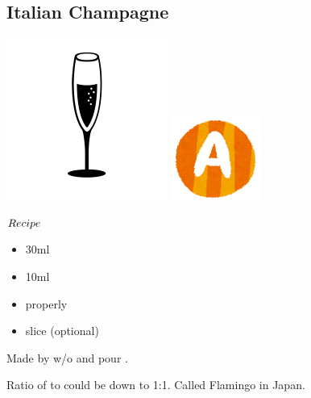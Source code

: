 \subsection{Italian Champagne}
\vspace{-7.4mm}
\hspace{49mm}
\includegraphics[scale=.08]{cocktail_glass_flute.png}
\includegraphics[scale=.12]{capital_a.png}
\vspace{2.5mm}
\begin{itembox}[l]{\boldmath $Recipe$}
\begin{itemize}
\setlength{\parskip}{0cm}
\setlength{\itemsep}{0cm}
\item \vodka 30ml
\item \campari 10ml
\item \champagne properly
\item \orange slice (optional)
\end{itemize}
\vspace{-4mm}
Made by \shake w/o \champagne and pour \champagne
\hspace{-1mm}.
\end{itembox}
Ratio of \vodka to \campari could be down to 1:1. Called Flamingo in Japan.

